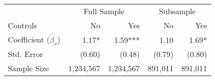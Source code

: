 \documentclass{standalone}
\begin{document}
\begin{tabular}{lrrrr}
\toprule 
\midrule 
  & \multicolumn{2}{c}{Full Sample} & \multicolumn{2}{c}{Subsample} \\
 \cmidrule(lr){2-3} \cmidrule(lr){4-5} 
Controls & No & Yes & No & Yes \\
\midrule 
Coefficient ($\tilde{\beta}_\nu$) & 1.17* & 1.59*** & 1.10 & 1.69* \\
Std. Error & (0.60) & (0.48) & (0.79) & (0.80) \\
\midrule 
Sample Size & 1,234,567 & 1,234,567 & 891,011 & 891,011 \\
\midrule 
\bottomrule 
\end{tabular}
\end{document}
